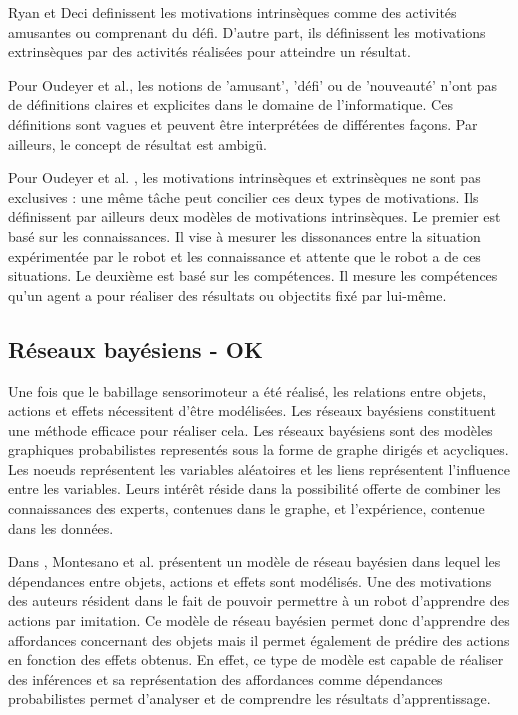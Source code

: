 \documentclass[draft]{llncs}
\begin{document}
Ryan et Deci definissent les motivations intrinsèques comme des activités amusantes ou comprenant du défi.
D'autre part, ils définissent les motivations extrinsèques par des activités réalisées pour atteindre un résultat.

Pour Oudeyer et al., les notions de 'amusant', 'défi' ou de 'nouveauté' n'ont pas de définitions claires et explicites dans le domaine de l'informatique.
Ces définitions sont vagues et peuvent être interprétées de différentes façons.
Par ailleurs, le concept de résultat est ambigü.

Pour Oudeyer et al. , les motivations intrinsèques et extrinsèques ne sont pas exclusives : une même tâche peut concilier ces deux types de motivations.
Ils définissent par ailleurs deux modèles de motivations intrinsèques.
Le premier est basé sur les connaissances.
Il vise à mesurer les dissonances entre la situation expérimentée par le robot et les connaissance et attente que le robot a de ces situations.
Le deuxième est basé sur les compétences. Il mesure les compétences qu'un agent a pour réaliser des résultats ou objectits fixé par lui-même.




\subsection{Réseaux bayésiens - OK}

Une fois que le babillage sensorimoteur a été réalisé, les relations entre objets, actions et effets nécessitent d'être modélisées.
Les réseaux bayésiens constituent une méthode efficace pour réaliser cela. 
Les réseaux bayésiens sont des modèles graphiques probabilistes representés sous la forme de graphe dirigés et acycliques.
Les noeuds représentent les variables aléatoires et les liens représentent l'influence entre les variables.
Leurs intérêt réside dans la possibilité offerte de combiner les connaissances des experts, contenues dans le graphe, et l'expérience, contenue dans les données.

Dans \cite{Montesano2008}, Montesano et al. présentent un modèle de réseau bayésien dans lequel les dépendances entre objets, actions et effets sont modélisés.
Une des motivations des auteurs résident dans le fait de pouvoir permettre à un robot d'apprendre des actions par imitation.
Ce modèle de réseau bayésien permet donc d'apprendre des affordances concernant des objets mais il permet également de prédire des actions en fonction des effets obtenus.
En effet, ce type de modèle est capable de réaliser des inférences et sa représentation des affordances comme dépendances probabilistes permet d'analyser et de comprendre les résultats d'apprentissage.
\end{document}
